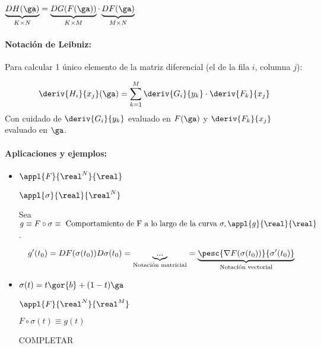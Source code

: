 \documentclass{apuntes}
\begin{document}
$\underbrace{DH(\ga)}_{K\times N} = \underbrace{DG(F(\ga))}_{K\times M}\cdot \underbrace{DF(\ga)}_{M\times N}$
 
\obs
\paragraph{Notación de Leibniz:}

Para calcular 1 único elemento de la matriz diferencial (el de la fila $i$, columna $j$):

$$\deriv{H_i}{x_j}(\ga) = \displaystyle\sum_{k=1}^M \deriv{G_i}{y_k}\cdot\deriv{F_k}{x_j}$$
Con cuidado de $\displaystyle \deriv{G_i}{y_k}$ evaluado en $\displaystyle F(\ga)$ y $\displaystyle\deriv{F_k}{x_j}$ evaluado en $\ga$.

\paragraph{Aplicaciones y ejemplos:}
\begin{itemize}
 \item 
 $\appl{F}{\real^N}{\real}$
 
 $\appl{\sigma}{\real}{\real^N}$
 
 Sea $g\equiv F\circ \sigma \equiv \text{ Comportamiento de F a lo largo de la curva } \sigma, \appl{g}{\real}{\real}$.

$$g'(t_0) = DF(\sigma(t_0))D\sigma(t_0) = \underbrace{...}_{\text{Notación matricial}} = \underbrace{\pesc{\nabla F(\sigma(t_0))}{\sigma'(t_0)}}_{\text{Notación vectorial}}$$

 
 \item 
 $\sigma(t) = t\gor{b} + (1-t)\ga$
 
 $\appl{F}{\real^N}{\real^M}$
 
 $F\circ \sigma(t) \equiv g(t)$
 
 COMPLETAR
\end{itemize}
\end{document}
